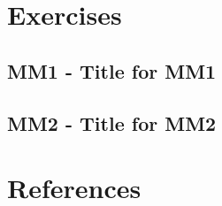 



    \singlespacing
    \pagestyle{empty}	
	
	\cleardoublepage
	
	\pagestyle{plain}
		
	\tableofcontents 
	\onehalfspacing
	\pagestyle{fancy} %
    \setcounter{page}{0} %

\part{Exercises}

\chapter{MM1 - Title for MM1}




\chapter{MM2 - Title for MM2}







\part{References}






